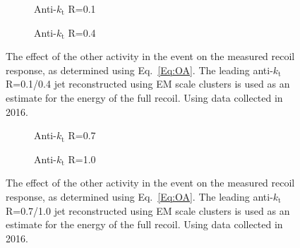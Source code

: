 \begin{figure}[!ht]
  \centering
  \begin{subfigure}{.5\textwidth}
    \centering
    \caption{Anti-$k_\mathrm{t}$ R=0.1}
  \end{subfigure}%
  \begin{subfigure}{.5\textwidth}  \centering
    \caption{Anti-$k_\mathrm{t}$ R=0.4}
  \end{subfigure}
  \caption[$\Delta^{\mathrm{OA}}$ using anti-$k_\mathrm{t}$ R=0.1/0.4 jets]
{\small The effect of the other activity in the event on the measured recoil response, as determined using Eq.~\ref{Eq:OA}.  The leading anti-$k_\mathrm{t}$ R=0.1/0.4 jet reconstructed using EM scale clusters is used as an estimate for the energy of the full recoil.  Using data collected in 2016.  }
  \label{Fig:OA_1-4}
\end{figure}


\begin{figure}[!ht]
  \centering
  \begin{subfigure}{.5\textwidth}
    \centering
    \caption{Anti-$k_\mathrm{t}$ R=0.7}
  \end{subfigure}%
  \begin{subfigure}{.5\textwidth}  \centering
    \caption{Anti-$k_\mathrm{t}$ R=1.0}
  \end{subfigure}
  \caption[$\Delta^{\mathrm{OA}}$ using anti-$k_\mathrm{t}$ R=0.7/1.0 jets]
{\small The effect of the other activity in the event on the measured recoil response, as determined using Eq.~\ref{Eq:OA}.  The leading anti-$k_\mathrm{t}$ R=0.7/1.0 jet reconstructed using EM scale clusters is used as an estimate for the energy of the full recoil.  Using data collected in 2016.  }
  \label{Fig:OA_7-10}
\end{figure}

